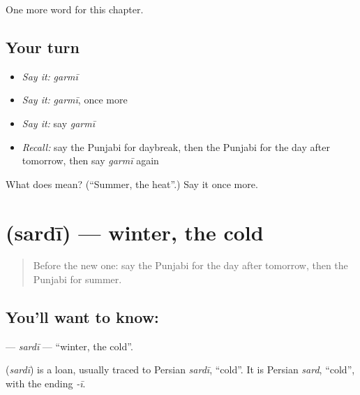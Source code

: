 \begin{grammarlens}[title={What you've built}]
One more word for this chapter.
\end{grammarlens}

\subsection*{Your turn}
\begin{itemize}
\raggedright
  \item \emph{Say it:} \emph{garmī}
  \item \emph{Say it:} \emph{garmī}, once more
  \item \emph{Say it:} say \emph{garmī}
  \item \emph{Recall:} say the Punjabi for daybreak, then the Punjabi for the day after tomorrow, then say \emph{garmī} again
\end{itemize}

\begin{tcolorbox}[breakable,colback=teal!4,colframe=teal!35!black,title={Before you move on}]
What does  mean? (\textquotedblleft{}Summer, the heat\textquotedblright{}.) Say it once more.
\end{tcolorbox}
\section[\texorpdfstring{\pa{ਸਰਦੀ} (sardī)}{ਸਰਦੀ (sardī)}]{ (sardī) — winter, the cold}

\label{lesson:PA-C99-sardi}



\begin{quote}
Before the new one: say the Punjabi for the day after tomorrow, then the Punjabi for summer.
\end{quote}

\subsection*{You'll want to know: }
\textbf{} — \emph{sardī} — \textquotedblleft{}winter, the cold\textquotedblright{}.

\begin{cousinweb}
\textbf{} (\emph{sardī}) is a loan, usually traced to Persian \emph{sardī}, \textquotedblleft{}cold\textquotedblright{}. It is Persian \emph{sard}, \textquotedblleft{}cold\textquotedblright{}, with the ending \emph{-ī}.
\end{cousinweb}

